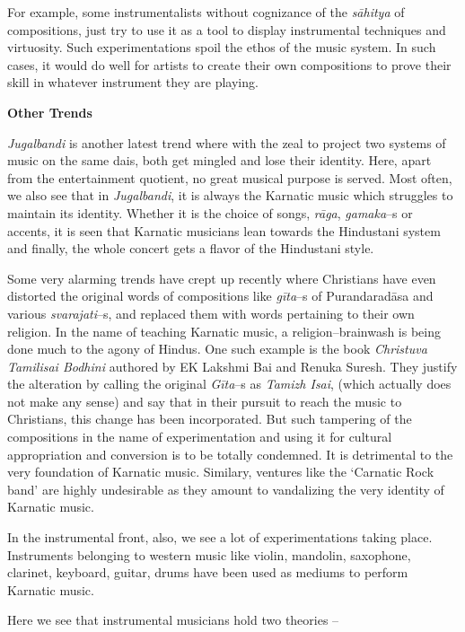 For example, some instrumentalists without cognizance of the \textit{sāhitya} of compositions, just try to use it as a tool to display instrumental techniques and virtuosity. Such experimentations spoil the ethos of the music system. In such cases, it would do well for artists to create their own compositions to prove their skill in whatever instrument they are playing.

\textbf{Other Trends}

\textit{Jugalbandi} is another latest trend where with the zeal to project two systems of music on the same dais, both get mingled and lose their identity. Here, apart from the entertainment quotient, no great musical purpose is served. Most often, we also see that in \textit{Jugalbandi}, it is always the Karnatic music which struggles to maintain its identity. Whether it is the choice of songs, \textit{rāga}, \textit{gamaka}–s or accents, it is seen that Karnatic musicians lean towards the Hindustani system and finally, the whole concert gets a flavor of the Hindustani style.

Some very alarming trends have crept up recently where Christians have even distorted the original words of compositions like \textit{gīta}–s of Purandaradāsa and various \textit{svarajati}–s, and replaced them with words pertaining to their own religion. In the name of teaching Karnatic music, a religion–brainwash is being done much to the agony of Hindus. One such example is the book \textit{Christuva Tamilisai Bodhini} authored by EK Lakshmi Bai and Renuka Suresh. They justify the alteration by calling the original \textit{Gīta}–s as \textit{Tamizh Isai}, (which actually does not make any sense) and say that in their pursuit to reach the music to Christians, this change has been incorporated. But such tampering of the compositions in the name of experimentation and using it for cultural appropriation and conversion is to be totally condemned. It is detrimental to the very foundation of Karnatic music. Similary, ventures like the ‘Carnatic Rock band’ are highly undesirable as they amount to vandalizing the very identity of Karnatic music.

In the instrumental front, also, we see a lot of experimentations taking place. Instruments belonging to western music like violin, mandolin, saxophone, clarinet, keyboard, guitar, drums have been used as mediums to perform Karnatic music.

Here we see that instrumental musicians hold two theories –

